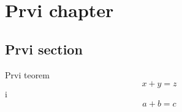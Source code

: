 \documentclass[main.tex]{subfiles}
\begin{document}
\nocite{*}

\chapter{Prvi chapter}
\section{Prvi section}
\begin{teorem}
	Prvi teorem
	\[
		x+y=z
	\] i
	\[
		a+b=c
	\]

\end{teorem}
\end{document}

